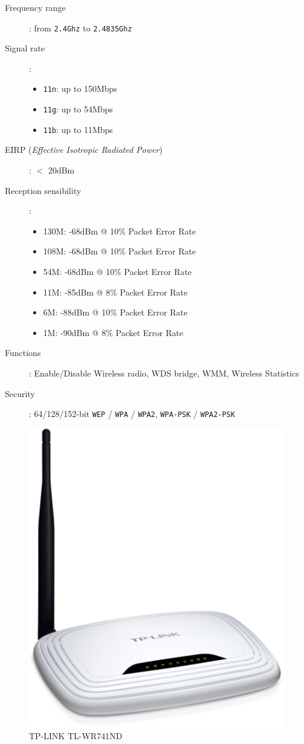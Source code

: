 \begin{description}
	\item [Frequency range]: from \texttt{2.4Ghz} to \texttt{2.4835Ghz}
	\item [Signal rate]:
		\begin{itemize}
			\item \texttt{11n}: up to 150Mbps
			\item \texttt{11g}: up to 54Mbps
			\item \texttt{11b}: up to 11Mbps
		\end{itemize}
	\item [EIRP (\textit{Effective Isotropic Radiated Power})]: $<$ 20dBm 
	\item [Reception sensibility]:
		\begin{itemize}
			\item 130M: -68dBm @ 10\% Packet Error Rate
			\item 108M: -68dBm @ 10\% Packet Error Rate
			\item 54M: -68dBm @ 10\% Packet Error Rate
			\item 11M: -85dBm @ 8\% Packet Error Rate
			\item 6M: -88dBm @ 10\% Packet Error Rate
			\item 1M: -90dBm @ 8\% Packet Error Rate
		\end{itemize}
	\item [Functions]: Enable/Disable Wireless radio, WDS bridge, WMM, Wireless Statistics
	\item [Security]: 64/128/152-bit \texttt{WEP} / \texttt{WPA} / \texttt{WPA2}, \texttt{WPA-PSK} / \texttt{WPA2-PSK}
\end{description}

\begin{figure}[H]
	\begin{center}
		\includegraphics[width=0.2\linewidth]{Pictures/chapter4/router.jpg}
		\caption{TP-LINK TL-WR741ND}
	\end{center}
\end{figure}

